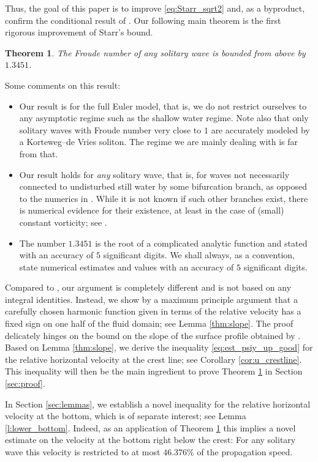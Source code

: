 \documentclass{amsart}
\newtheorem{theorem}{Theorem}
\theoremstyle{definition}
\begin{document}
Thus, the goal of this paper is to improve \eqref{eq:Starr_sqrt2} and, as a byproduct, confirm the conditional result of \cite{Kozlov2023-sw}. Our following main theorem is the first rigorous improvement of Starr's bound.

\begin{theorem} \label{thm:main}
	The Froude number of any solitary wave is bounded from above by $1.3451$.
\end{theorem}

Some comments on this result:
\begin{itemize}
	\item Our result is for the full Euler model, that is, we do not restrict ourselves to any asymptotic regime such as the shallow water regime. Note also that only solitary waves with Froude number very close to $1$ are accurately modeled by a Korteweg--de Vries soliton. The regime we are mainly dealing with is far from that.
	\item Our result holds for \emph{any} solitary wave, that is, for waves not necessarily connected to undisturbed still water by some bifurcation branch, as opposed to the numerics in \cite{Longuet-Higgins1974-py}. While it is not known if such other branches exist, there is numerical evidence for their existence, at least in the case of (small) constant vorticity; see \cite{VandenBroeck_1994}.
	\item The number $1.3451$ is the root of a complicated analytic function and stated with an accuracy of $5$ significant digits. We shall always, as a convention, state numerical estimates and values with an accuracy of $5$ significant digits.
\end{itemize}

Compared to \cite{Starr47}, our argument is completely different and is not based on any integral identities. Instead, we show by a maximum principle argument that a carefully chosen harmonic function given in terms of the relative velocity has a fixed sign on one half of the fluid domain; see Lemma \ref{thm:slope}. The proof delicately hinges on the bound on the slope of the surface profile obtained by \cite{Amick1987}. Based on Lemma \ref{thm:slope}, we derive the inequality \eqref{eq:est_psiy_up_good} for the relative horizontal velocity at the crest line; see Corollary \ref{cor:u_crestline}. This inequality will then be the main ingredient to prove Theorem \ref{thm:main} in Section \ref{sec:proof}.

In Section \ref{sec:lemmas}, we establish a novel inequality for the relative horizontal velocity at the bottom, which is of separate interest; see Lemma \ref{l:lower_bottom}. Indeed, as an application of Theorem \ref{thm:main} this implies a novel estimate on the velocity at the bottom right below the crest: For any solitary wave this velocity is restricted to at most $46.376\%$ of the propagation speed.
\end{document}
